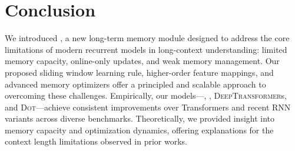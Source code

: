 \section{Conclusion}\label{sec:concolusion}

We introduced \model{}, a new long-term memory module designed to address the core limitations of modern recurrent models in long-context understanding: limited memory capacity, online-only updates, and weak memory management. Our proposed sliding window learning rule, higher-order feature mappings, and advanced memory optimizers offer a principled and scalable approach to overcoming these challenges. Empirically, our models—\omodel, \model, \textsc{DeepTransformer}s, and \textsc{Dot}—achieve consistent improvements over Transformers and recent RNN variants across diverse benchmarks. Theoretically, we provided insight into memory capacity and optimization dynamics, offering explanations for the context length limitations observed in prior works. 